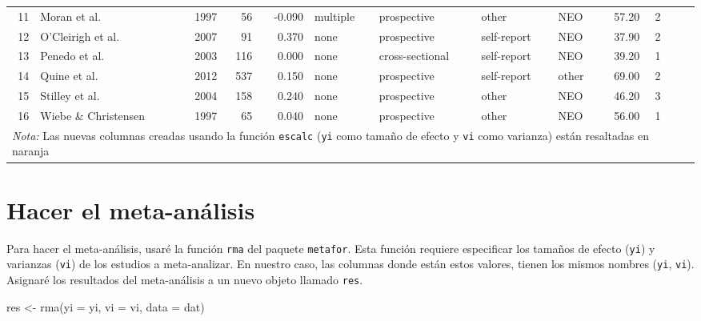 \documentclass[
  bookmarksnumbered]{article}
\newenvironment{Shaded}{\begin{snugshade}}{\end{snugshade}}
\newcommand{\AttributeTok}[1]{\textcolor[rgb]{0.00,0.34,0.68}{#1}}
\newcommand{\FunctionTok}[1]{\textcolor[rgb]{0.39,0.29,0.61}{#1}}
\newcommand{\NormalTok}[1]{\textcolor[rgb]{0.12,0.11,0.11}{#1}}
\newcommand{\OtherTok}[1]{\textcolor[rgb]{0.00,0.43,0.16}{#1}}
\begin{document}
\begin{table}[H]
{\begin{tabular}[t]{rlrrrllllrr>{}r>{}r}
11 & Moran et al. & 1997 & 56 & -0.090 & multiple & prospective & other & NEO & 57.20 & 2 & \cellcolor[HTML]{f68212}{-0.0902442} & \cellcolor[HTML]{f68212}{0.0188679}\\
12 & O'Cleirigh et al. & 2007 & 91 & 0.370 & none & prospective & self-report & NEO & 37.90 & 2 & \cellcolor[HTML]{f68212}{0.3884231} & \cellcolor[HTML]{f68212}{0.0113636}\\
13 & Penedo et al. & 2003 & 116 & 0.000 & none & cross-sectional & self-report & NEO & 39.20 & 1 & \cellcolor[HTML]{f68212}{0.0000000} & \cellcolor[HTML]{f68212}{0.0088496}\\
14 & Quine et al. & 2012 & 537 & 0.150 & none & prospective & self-report & other & 69.00 & 2 & \cellcolor[HTML]{f68212}{0.1511404} & \cellcolor[HTML]{f68212}{0.0018727}\\
15 & Stilley et al. & 2004 & 158 & 0.240 & none & prospective & other & NEO & 46.20 & 3 & \cellcolor[HTML]{f68212}{0.2447741} & \cellcolor[HTML]{f68212}{0.0064516}\\
16 & Wiebe \& Christensen & 1997 & 65 & 0.040 & none & prospective & other & NEO & 56.00 & 1 & \cellcolor[HTML]{f68212}{0.0400214} & \cellcolor[HTML]{f68212}{0.0161290}\\
\bottomrule
\multicolumn{13}{l}{\rule{0pt}{1em}\textit{Nota:} Las nuevas columnas creadas usando la función \texttt{escalc} 
           (\texttt{yi} como tamaño de efecto y \texttt{vi} como varianza) están 
           resaltadas en naranja}\\
\end{tabular}}
\end{table}

\hypertarget{meta-cor}{%
\section{Hacer el meta-análisis}\label{meta-cor}}

Para hacer el meta-análisis, usaré la función \texttt{rma} del paquete \texttt{metafor}. Esta función requiere especificar los tamaños de efecto (\texttt{yi}) y varianzas (\texttt{vi}) de los estudios a meta-analizar. En nuestro caso, las columnas donde están estos valores, tienen los mismos nombres (\texttt{yi}, \texttt{vi}). Asignaré los resultados del meta-análisis a un nuevo objeto llamado \texttt{res}.

\begin{Shaded}
\begin{Highlighting}[]
\NormalTok{res }\OtherTok{\textless{}{-}} \FunctionTok{rma}\NormalTok{(}\AttributeTok{yi =}\NormalTok{ yi, }\AttributeTok{vi =}\NormalTok{ vi, }\AttributeTok{data =}\NormalTok{ dat)}
\end{Highlighting}
\end{Shaded}
\end{document}
